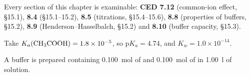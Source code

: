 \documentclass{apchem-exam}
\begin{document}
\apctitleblock

\begin{apcnote}[Scope]
Every section of this chapter is examinable: \textbf{CED 7.12}
(common-ion effect, \S15.1), \textbf{8.4} (\S15.1--15.2), \textbf{8.5}
(titrations, \S15.4--15.6), \textbf{8.8} (properties of buffers,
\S15.2), \textbf{8.9} (Henderson--Hasselbalch, \S15.2) and \textbf{8.10}
(buffer capacity, \S15.3).

Take $K_a(\ce{CH3COOH}) = 1.8\times10^{-5}$, so
$\mathrm{p}K_a = 4.74$, and $K_w = 1.0\times10^{-14}$.
\end{apcnote}



A buffer is prepared containing \SI{0.100}{\mole} of  and
\SI{0.100}{\mole} of  in \SI{1.00}{\litre} of solution.
\end{document}
